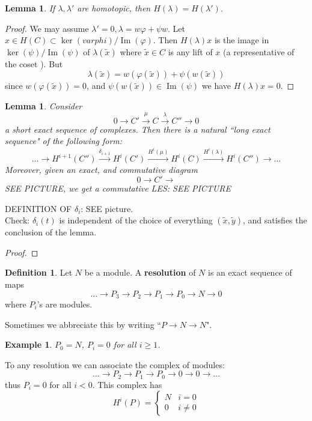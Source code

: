 \documentclass[12pt]{article}
\DeclareMathOperator{\Im}{Im}
\newtheorem{lemma}[theorem]{Lemma}
\newtheorem*{eg}{Example}
\theoremstyle{definition}
\newtheorem{definition}[theorem]{Definition}
\begin{document}
\begin{lemma}
If $\lambda, \lambda'$ are homotopic, then $H(\lambda) = H(\lambda')$.

\end{lemma}
\begin{proof}
We may assume $\lambda ' =0, \lambda = w\varphi+\psi w$. Let $x \in H(C) \subset \ker(varphi)/\Im(\varphi)$. Then $H(\lambda)x$ is the image in $\ker(\psi)/\Im(\psi)$ of $\lambda(\tilde{x})$ where $\tilde{x} \in C$ is any lift of $x$ (a representative of the coset ). But
\[
\lambda(\tilde{x}) = w(\varphi(\tilde{x})) + \psi(w(\tilde{x}))  
\]
since $w(\varphi(\tilde{x})) = 0$, and $\psi(w(\tilde{x}))  \in \Im(\psi)$ we have $H(\lambda)x =0$.
\end{proof}
\begin{lemma}


Consider
\[
0 \rightarrow C'\xrightarrow{\mu} C \xrightarrow{\lambda} C'' \rightarrow 0
\]
a short exact sequence of complexes. Then there is a natural ``long exact sequence" of the following form:
\[
\dots \rightarrow H^{i+1}(C'')\xrightarrow{\delta_{i+1}} H^i(C') \xrightarrow{H^i(\mu)} H^i(C) \xrightarrow{H^i(\lambda)} H^i(C'') \rightarrow \dots
\]
Moreover, given an exact, and commutative diagram 
\[
0 \rightarrow C' \rightarrow 
\]
SEE PICTURE, we get a commutative LES:
SEE PICTURE
\end{lemma}
DEFINITION OF $\delta_i$: SEE picture. \\
Check: $\delta_i(t)$ is independent of the choice of everything $(\tilde{x}, \tilde{y})$, and satisfies the conclusion of the lemma. 
\begin{proof}

\end{proof}
\begin{definition}
Let $N$ be a module. A \textbf{resolution } of $N$ is an exact sequence of maps 
\[
\dots \rightarrow P_3 \rightarrow P_2 \rightarrow P_1 \rightarrow P_0 \rightarrow N \rightarrow 0
\]
where $P_i$'s are modules.
\end{definition}
Sometimes we abbreciate this by writing ``$P\rightarrow N \rightarrow N$". \\
\begin{eg}
$P_0 = N$, $P_i = 0$ for all $i\geq 1$. 
\end{eg}

To any resolution we can associate the complex of modules:
\[
\dots \rightarrow P_2 \rightarrow P_1\rightarrow P_0 \rightarrow 0 \rightarrow 0 \rightarrow \dots
\]
thus $P_i = 0 $ for all $i<0$. This complex has
\[
H^i(P)=
\begin{cases}
N & i=0\\
0 & i\neq 0
\end{cases}

\]
\end{document}
